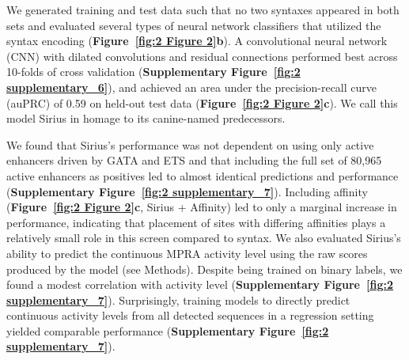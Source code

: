 We generated training and test data such that no two syntaxes appeared in both sets and evaluated several types of neural network classifiers that utilized the syntax encoding (\textbf{Figure~\ref{fig:2 Figure 2}b}). A convolutional neural network (CNN) with dilated convolutions and residual connections\cite{Koo2021-ly} performed best across 10-folds of cross validation (\textbf{Supplementary Figure~\ref{fig:2 supplementary_6}}), and achieved an area under the precision-recall curve (auPRC) of 0.59 on held-out test data (\textbf{Figure~\ref{fig:2 Figure 2}c}). We call this model Sirius in homage to its canine-named predecessors\cite{Kelley2016-oh,Gosai2023-cw}.

We found that Sirius’s performance was not dependent on using only active enhancers driven by GATA and ETS and that including the full set of 80,965 active enhancers as positives led to almost identical predictions and performance (\textbf{Supplementary Figure~\ref{fig:2 supplementary_7}}). Including affinity (\textbf{Figure~\ref{fig:2 Figure 2}c}, Sirius + Affinity) led to only a marginal increase in performance, indicating that placement of sites with differing affinities plays a relatively small role in this screen compared to syntax. We also evaluated Sirius’s ability to predict the continuous MPRA activity level using the raw scores produced by the model (see Methods). Despite being trained on binary labels, we found a modest correlation with activity level (\textbf{Supplementary Figure~\ref{fig:2 supplementary_7}}). Surprisingly, training models to directly predict continuous activity levels from all detected sequences in a regression setting yielded comparable performance (\textbf{Supplementary Figure~\ref{fig:2 supplementary_7}}). 

